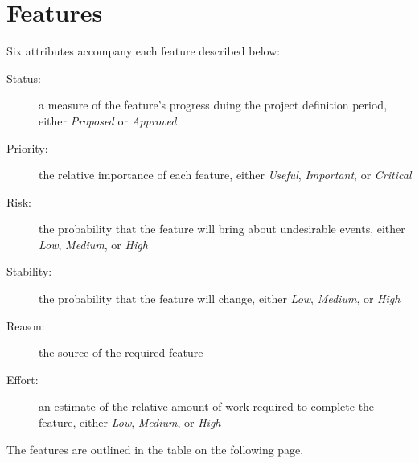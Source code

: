 \documentclass[12pt]{article}
\begin{document}
\section{Features}
Six attributes accompany each feature described below: 
    \begin{description}
        \item[Status:] a  measure of the feature's progress duing the project definition period, either \textit{Proposed} or \textit{Approved}
        \item[Priority:] the relative importance of each feature, either \textit{Useful}, \textit{Important}, or \textit{Critical}
        \item[Risk:] the probability that the feature will bring about undesirable events, either \textit{Low}, \textit{Medium}, or \textit{High}
        \item[Stability:] the probability that the feature will change, either \textit{Low}, \textit{Medium}, or \textit{High}
        \item[Reason:] the source of the required feature
        \item[Effort:] an estimate of the relative amount of work required to complete the feature, either \textit{Low}, \textit{Medium}, or \textit{High}
    \end{description}
    The features are outlined in the table on the following page.
\end{document}
